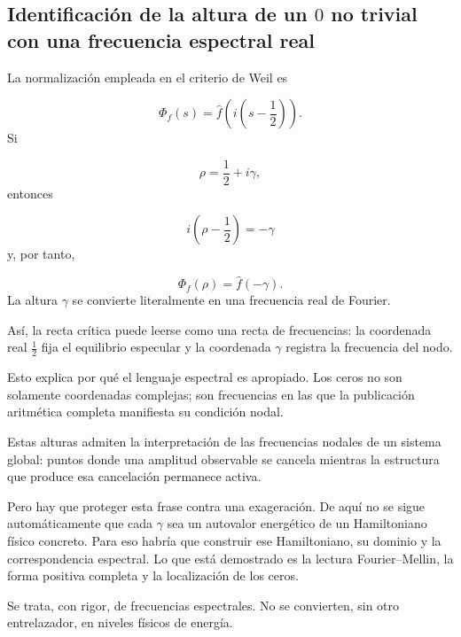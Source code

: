 \subsection{Identificación de la altura de un \(0\) no trivial con una frecuencia espectral real}
La normalización empleada en el criterio de Weil es\par
\[
\Phi_f(s)
=
\widehat f\!\left(
i\left(s-\frac12\right)
\right).
\]
Si\par
\[
\rho=\frac12+i\gamma,
\]
entonces\par
\[
i\left(\rho-\frac12\right)
=
-\gamma
\]
y, por tanto,\par
\[
\Phi_f(\rho)
=
\widehat f(-\gamma).
\]
La altura \(\gamma\) se convierte literalmente en una frecuencia real de Fourier.\par
Así, la recta crítica puede leerse como una recta de frecuencias: la coordenada real \(\tfrac12\) fija el equilibrio especular y la coordenada \(\gamma\) registra la frecuencia del nodo.\par
Esto explica por qué el lenguaje espectral es apropiado. Los ceros no son solamente coordenadas complejas; son frecuencias en las que la publicación aritmética completa manifiesta su condición nodal.\par
Estas alturas admiten la interpretación de las frecuencias nodales de un sistema global: puntos donde una amplitud observable se cancela mientras la estructura que produce esa cancelación permanece activa.\par
Pero hay que proteger esta frase contra una exageración. De aquí no se sigue automáticamente que cada \(\gamma\) sea un autovalor energético de un Hamiltoniano físico concreto. Para eso habría que construir ese Hamiltoniano, su dominio y la correspondencia espectral. Lo que está demostrado es la lectura Fourier–Mellin, la forma positiva completa y la localización de los ceros.\par
Se trata, con rigor, de frecuencias espectrales. No se convierten, sin otro entrelazador, en niveles físicos de energía.\par
{}
